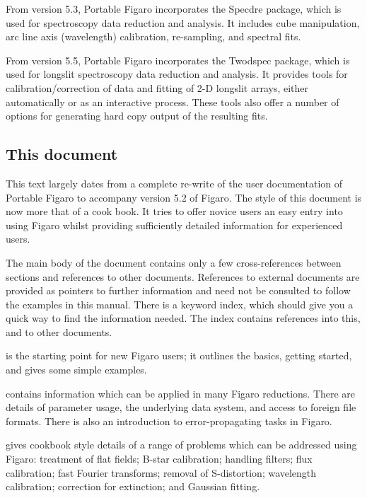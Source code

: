 From version 5.3, Portable Figaro incorporates the Specdre package, which 
is used for spectroscopy data reduction and analysis. It includes cube 
manipulation, arc line axis (wavelength) calibration, re-sampling, and 
spectral fits.

From version 5.5, Portable Figaro incorporates the Twodspec package, which
is used for longslit spectroscopy data reduction and analysis. It provides
tools for calibration/correction of data and fitting of 2-D longslit arrays,
either automatically or as an interactive process. These tools also offer a
number of options for generating hard copy output of the resulting fits.

\subsection{This document}

This text largely dates from a complete re-write of the user documentation
of Portable Figaro to accompany version 5.2 of Figaro.
The style of this document is now more that of a cook book.
It tries to offer novice users an easy entry into using Figaro whilst
providing sufficiently detailed information for experienced users.

The main body of the document contains only a few cross-references
between sections and references to other documents.
References to external documents are provided as pointers to further
information and need not be consulted to follow the examples in this manual.
There is a keyword index, which should give you a quick way to find
the information needed.
The index contains references into this, and to other documents.

 is the starting point for new Figaro users;
it outlines the basics, getting started, and gives some simple examples.

 contains information which
can be applied in many Figaro reductions.  There are details of parameter
usage, the underlying data system, and access to foreign file formats.
There is also an introduction to error-propagating tasks in Figaro.

 gives cookbook style
details of a range of problems which can be addressed using Figaro:
treatment of flat fields; B-star calibration; handling filters;
flux calibration; fast Fourier transforms; removal of S-distortion;
wavelength calibration; correction for extinction; and Gaussian fitting.

